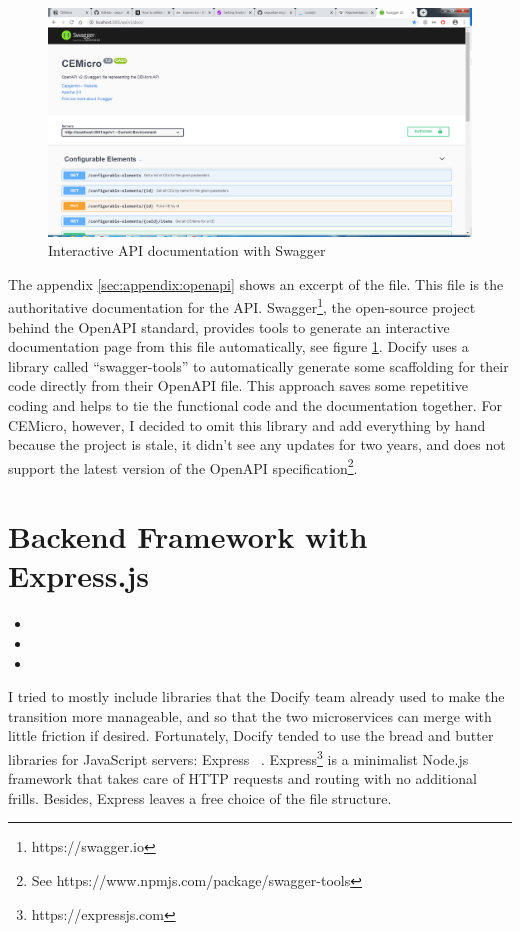 \begin{figure}[ht]
  \centering
  \includegraphics[width=0.8\linewidth]{assets/swagger-api-docs.png}
  \caption{Interactive API documentation with Swagger}
  \label{fig:api-docs}
\end{figure}

The appendix \ref{sec:appendix:openapi} shows an excerpt of the  file. This file is the authoritative documentation for the API. Swagger\footnote{https://swagger.io}, the open-source project behind the OpenAPI standard, provides tools to generate an interactive documentation page from this file automatically, see figure \ref{fig:api-docs}. Docify uses a library called ``swagger-tools'' to automatically generate some scaffolding for their code directly from their OpenAPI file. This approach saves some repetitive coding and helps to tie the functional code and the documentation together. For CEMicro, however, I decided to omit this library and add everything by hand because the project is stale, it didn't see any updates for two years, and does not support the latest version of the OpenAPI specification\footnote{See https://www.npmjs.com/package/swagger-tools}.


\section{Backend Framework with Express.js}

\begin{itemize}
  \item {}
  \item {}
  \item {}
\end{itemize}

I tried to mostly include libraries that the Docify team already used to make the transition more manageable, and so that the two microservices can merge with little friction if desired. Fortunately, Docify tended to use the bread and butter libraries for JavaScript servers: Express ~\cite{stateofjs.2019}. Express\footnote{https://expressjs.com} is a minimalist Node.js framework that takes care of HTTP requests and routing with no additional frills. Besides, Express leaves a free choice of the file structure.

